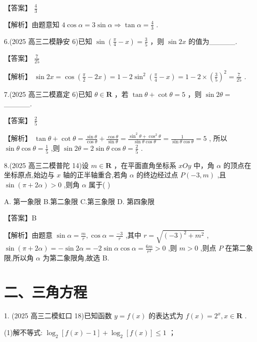 \documentclass[10pt]{article}
\begin{document}
【答案】 \(\frac{4}{3}\)

【解析】由题意知 \(4\cos \alpha  = 3\sin \alpha  \Rightarrow  \tan \alpha  = \frac{4}{3}\) .

6.(2025 高三二模静安 6)已知 \(\sin \left( {\frac{\pi }{4} - x}\right)  = \frac{3}{5}\) ，则 \(\sin {2x}\) 的值为\_\_\_\_\_.

【答案】 \(\frac{7}{25}\)

【解析】 \(\sin {2x} = \cos \left( {\frac{\pi }{2} - {2x}}\right)  = 1 - 2{\sin }^{2}\left( {\frac{\pi }{4} - x}\right)  = 1 - 2 \times  {\left( \frac{3}{5}\right) }^{2} = \frac{7}{25}\) .

7.(2025 高三二模嘉定 6)已知 \(\theta  \in  \mathbf{R}\) ，若 \(\tan \theta  + \cot \theta  = 5\) ，则 \(\sin {2\theta } =\) \_\_\_\_\_.

【答案】 \(\frac{2}{5}\)

【解析】 \(\tan \theta  + \cot \theta  = \frac{\sin \theta }{\cos \theta } + \frac{\cos \theta }{\sin \theta } = \frac{{\sin }^{2}\theta  + {\cos }^{2}\theta }{\sin \theta \cos \theta } = \frac{1}{\sin \theta \cos \theta } = 5\) , 所以 \(\sin \theta \cos \theta  = \frac{1}{5}\) ,则 \(\sin {2\theta } = 2\sin \theta \cos \theta  = \frac{2}{5}\) .

8.(2025 高三二模普陀 14)设 \(m \in  \mathbf{R}\) ，在平面直角坐标系 \({xOy}\) 中，角 \(\alpha\) 的顶点在坐标原点,始边与 \(x\) 轴的正半轴重合,若角 \(\alpha\) 的终边经过点 \(P\left( {-3,m}\right)\) ,且 \(\sin \left( {\pi  + {2\alpha }}\right)  > 0\) ,则角 \(\alpha\) 属于( )

A. 第一象限 B.第二象限 C.第三象限 D. 第四象限

【答案】B

【解析】由题意 \(\sin \alpha  = \frac{m}{r},\cos \alpha  = \frac{-3}{r}\) ,其中 \(r = \sqrt{{\left( -3\right) }^{2} + {m}^{2}}\) , \(\sin \left( {\pi  + {2\alpha }}\right)  =  - \sin {2\alpha } =  - 2\sin \alpha \cos \alpha  = \frac{6m}{{r}^{2}} > 0\) ,则 \(m > 0\) ,则点 \(P\) 在第二象限,所以角 \(\alpha\) 为第二象限角,故选 B.

\section*{二、三角方程}

1. (2025 高三二模虹口 18)已知函数 \(y = f\left( x\right)\) 的表达式为 \(f\left( x\right)  = {2}^{x},x \in  \mathbf{R}\) .

(1)解不等式: \({\log }_{2}\left\lbrack  {f\left( x\right)  - 1}\right\rbrack   + {\log }_{2}\left\lbrack  {f\left( x\right) }\right\rbrack   \leq  1\) ；
\end{document}
